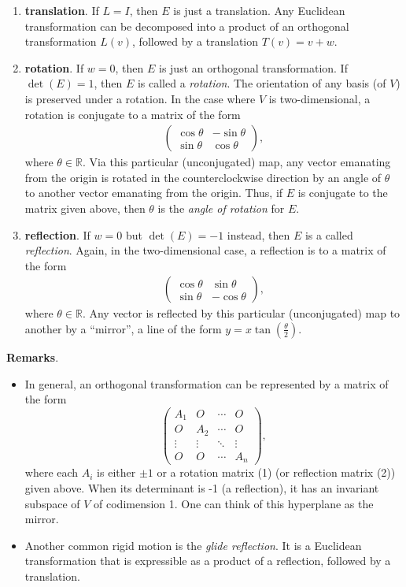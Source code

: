 \documentclass[12pt]{article}
\begin{document}
\begin{enumerate}
\item
\textbf{translation}. If $L=I$, then $E$ is just a translation.  Any
Euclidean transformation can be decomposed into a product of an
orthogonal transformation $L(v)$, followed by a
translation $T(v)=v+w$.
\item
\textbf{rotation}.  If $w=0$, then $E$ is just an orthogonal transformation.  If $\operatorname{det}(E)=1$, then $E$ is called a \emph{rotation}.  The
orientation of any basis (of $V$) is preserved under a rotation.  In the
case where $V$ is two-dimensional, a rotation is conjugate to a matrix of the form
\begin{eqnarray}
\begin{pmatrix}
\cos \theta & -\sin \theta \\
\sin \theta & \cos \theta
\end{pmatrix},
\end{eqnarray}
where $\theta\in \mathbb{R}$. Via this particular (unconjugated) map, any vector emanating from the origin is rotated
in the counterclockwise direction by an angle of $\theta$ to another vector emanating from the origin.  Thus, if $E$ is conjugate to the matrix given above, then $\theta$ is the \emph{angle of rotation} for $E$.
\item
\textbf{reflection}. If $w=0$ but $\operatorname{det}(E)=-1$ instead, then $E$ is a called
\emph{reflection}.  Again, in the two-dimensional case, a reflection is
 to a matrix of the form
\begin{eqnarray}
\begin{pmatrix}
\cos \theta & \sin \theta \\
\sin \theta & -\cos \theta
\end{pmatrix},
\end{eqnarray}
where $\theta\in \mathbb{R}$.  Any vector is reflected by this particular (unconjugated) map to another
by a ``mirror'', a line of the form $y=x\tan(\frac{\theta}{2})$.
\end{enumerate}

\textbf{Remarks}.
\begin{itemize}
\item
In general, an orthogonal transformation can be represented by a matrix of the
form
$$
\begin{pmatrix}
A_1 & O & \cdots & O \\
O & A_2 & \cdots & O \\
\vdots & \vdots & \ddots & \vdots \\
O & O & \cdots & A_n
\end{pmatrix},
$$
where each $A_i$ is either $\pm 1$ or a rotation matrix (1) (or reflection
matrix (2)) given above.  When its determinant is -1 (a reflection), it has an invariant subspace of $V$ of codimension 1.  One can think of this hyperplane as the mirror.
\item  Another common rigid motion is the \emph{glide reflection}.  It is a Euclidean transformation that is expressible as a product of a reflection, followed by a translation.
\end{itemize}

\end{document}
